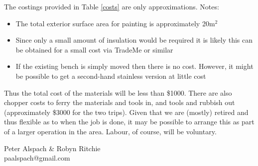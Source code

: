 \documentclass[12pt]{article} %
\begin{document}
The costings provided in Table \ref{costs} are only approximations.  Notes:

\begin{itemize}
 \item The total exterior surface area for painting is approximately 20m$^2$
 \item Since only a small amount of insulation would be required it is likely this can be obtained for a small cost via TradeMe or similar
 \item If the existing bench is simply moved then there is no cost.  However, it might be possible to get a second-hand stainless version at little cost
\end{itemize}

Thus the total cost of the materials will be less than \$1000.  There are also chopper costs to ferry the materials and tools in, and tools and rubbish out (approximately \$3000 for the two trips).  Given that we are (mostly) retired and thus flexible as to when the job is done, it may be possible to arrange this as part of a larger operation in the area.  Labour, of course, will be voluntary.

\begin{flushright}
Peter Alspach \& Robyn Ritchie\\
paalspach@gmail.com
\end{flushright}
\end{document}
